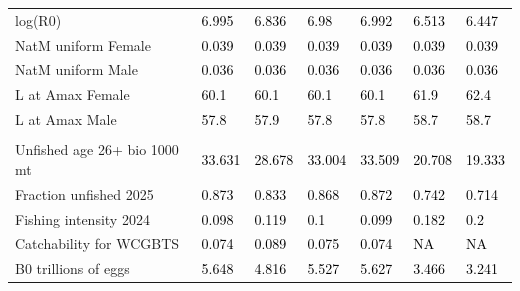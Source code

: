 \documentclass[
]{scrartcl}
\begin{document}
\begin{landscape}
\begin{longtable}[t]{ll>{\raggedright\arraybackslash}p{5em}>{\raggedright\arraybackslash}p{5em}>{\raggedright\arraybackslash}p{5em}>{\raggedright\arraybackslash}p{5em}>{\raggedright\arraybackslash}p{5em}}
\hspace{1em}log(R0) & \textcolor{black}{6.995} & \textcolor{black}{6.836} & \textcolor{black}{6.98} & \textcolor{black}{6.992} & \textcolor{black}{6.513} & \textcolor{black}{6.447}\\
\hspace{1em}NatM uniform Female & \textcolor{black}{0.039} & \textcolor{black}{0.039} & \textcolor{black}{0.039} & \textcolor{black}{0.039} & \textcolor{black}{0.039} & \textcolor{black}{0.039}\\
\hspace{1em}NatM uniform Male & \textcolor{black}{0.036} & \textcolor{black}{0.036} & \textcolor{black}{0.036} & \textcolor{black}{0.036} & \textcolor{black}{0.036} & \textcolor{black}{0.036}\\
\hspace{1em}L at Amax Female & \textcolor{black}{60.1} & \textcolor{black}{60.1} & \textcolor{black}{60.1} & \textcolor{black}{60.1} & \textcolor{black}{61.9} & \textcolor{black}{62.4}\\
\hspace{1em}L at Amax Male & \textcolor{black}{57.8} & \textcolor{black}{57.9} & \textcolor{black}{57.8} & \textcolor{black}{57.8} & \textcolor{black}{58.7} & \textcolor{black}{58.7}\\
\addlinespace[0.3em]
\multicolumn{7}{l}{\textbf{Estimates of derived quantities}}\\
\hspace{1em}Unfished age 26+ bio 1000 mt & \textcolor{black}{33.631} & \textcolor{black}{28.678} & \textcolor{black}{33.004} & \textcolor{black}{33.509} & \textcolor{black}{20.708} & \textcolor{black}{19.333}\\
\hspace{1em}Fraction unfished 2025 & \textcolor{black}{0.873} & \textcolor{black}{0.833} & \textcolor{black}{0.868} & \textcolor{black}{0.872} & \textcolor{black}{0.742} & \textcolor{black}{0.714}\\
\hspace{1em}Fishing intensity 2024 & \textcolor{black}{0.098} & \textcolor{black}{0.119} & \textcolor{black}{0.1} & \textcolor{black}{0.099} & \textcolor{black}{0.182} & \textcolor{black}{0.2}\\
\hspace{1em}Catchability for WCGBTS & \textcolor{black}{0.074} & \textcolor{black}{0.089} & \textcolor{black}{0.075} & \textcolor{black}{0.074} & \textcolor{black}{NA} & \textcolor{black}{NA}\\
\hspace{1em}B0 trillions of eggs & \textcolor{black}{5.648} & \textcolor{black}{4.816} & \textcolor{black}{5.527} & \textcolor{black}{5.627} & \textcolor{black}{3.466} & \textcolor{black}{3.241}\\

\end{longtable}
\end{landscape}
\end{document}

